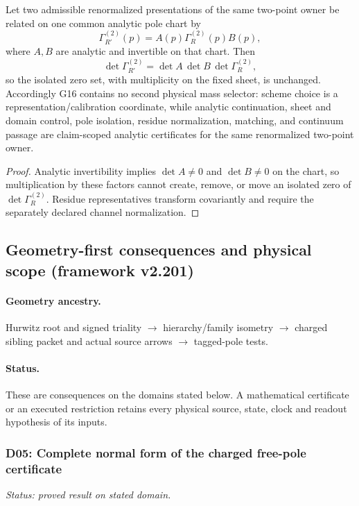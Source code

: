 \documentclass[12pt,a4paper]{article}
\begin{document}
\begin{corollary}
\label{p6:cor:v577-pole-owner-direction-reversal}
Let two admissible renormalized presentations of the same two-point owner be
related on one common analytic pole chart by
\[
 \Gamma_{R'}^{(2)}(p)=A(p)\Gamma_R^{(2)}(p)B(p),
\]
where \(A,B\) are analytic and invertible on that chart.  Then
\[
 \det\Gamma_{R'}^{(2)}
 =\det A\,\det B\,\det\Gamma_R^{(2)},
\]
so the isolated zero set, with multiplicity on the fixed sheet, is unchanged.
Accordingly G16 contains no second physical mass selector: scheme choice is a
representation/calibration coordinate, while analytic continuation, sheet and
domain control, pole isolation, residue normalization, matching, and continuum
passage are claim-scoped analytic certificates for the same renormalized
two-point owner.
\end{corollary}

\begin{proof}
Analytic invertibility implies \(\det A\neq0\) and \(\det B\neq0\) on the
chart, so multiplication by these factors cannot create, remove, or move an
isolated zero of \(\det\Gamma_R^{(2)}\).  Residue representatives transform
covariantly and require the separately declared channel normalization.
\end{proof}

\subsection{Geometry-first consequences and physical scope (framework v2.201)}
\label{p6:sec:v2201-geometry-first-consequences}
\paragraph{Geometry ancestry.}
Hurwitz root and signed triality $\to$ hierarchy/family isometry $\to$ charged sibling packet and actual source arrows $\to$ tagged-pole tests.
\paragraph{Status.}
These are consequences on the domains stated below.
A mathematical certificate or an executed restriction retains every
physical source, state, clock and readout hypothesis of its inputs.

\subsubsection{D05: Complete normal form of the charged free-pole certificate}
\label{p6:sec:v2201-derived-d05}
\noindent\textit{Status: proved result on stated domain.}
\end{document}
